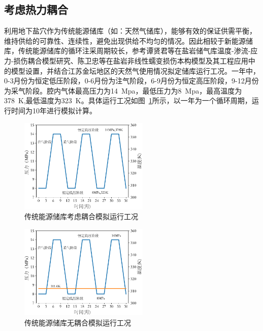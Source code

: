 \subsection{考虑热力耦合}
利用地下盐穴作为传统能源储库（如：天然气储库），能够有效的保证供需平衡，维持供给的可靠性、连续性，避免出现供给不均匀的情况。因此相较于新能源储库，传统能源储库的循环注采周期较长，参考谭贤君等\cite{陈卫忠2007盐岩非线性蠕变损伤本构模型及其工程应用,盐岩储气库温度}在盐岩储气库温度-渗流-应力-损伤耦合模型研究、陈卫忠等在盐岩非线性蠕变损伤本构模型及其工程应用中的模型设置，并结合江苏金坛地区的天然气使用情况拟定储库运行工况。一年中，0-3月份为恒定低压阶段，0-6月份为注气阶段，6-9月份为恒定高压阶段，9-12月份为采气阶段。腔内气体最高压力为\SI{14}{Mpa}，最低压力为\SI{8}{Mpa}，最高温度为\SI{378}{K},最低温度为\SI{323}{K}。具体运行工况如图~\ref{fig:5_10}所示，以一年为一个循环周期，运行时间为10年进行模拟计算。
\begin{figure}[ht!]
    \centering
    \includegraphics[width=0.55\textwidth]{img/chap5/10年天然气储库运行工况.pdf}
    \caption{传统能源储库考虑耦合模拟运行工况}
    \label{fig:5_10}
\end{figure}
\begin{figure}[ht!]
    \centering
    \includegraphics[width=0.55\textwidth]{img/chap5/储气库无耦合.pdf}
    \caption{传统能源储库无耦合模拟运行工况}
    \label{fig:5_11}
\end{figure}


